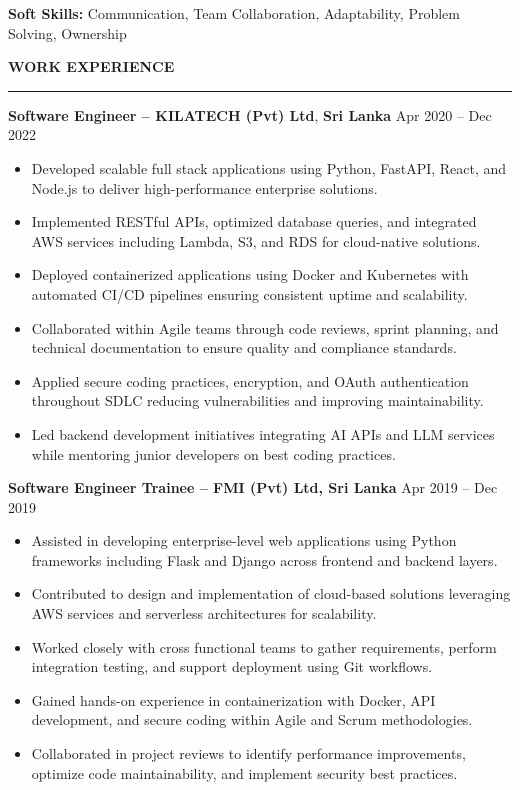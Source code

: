 \documentclass[10pt,letterpaper]{article}
\begin{document}
\textbf{Soft Skills:} Communication, Team Collaboration, Adaptability, Problem Solving, Ownership

\vspace{8pt}

\textbf{WORK EXPERIENCE}\\[-8pt]
\noindent\rule{\textwidth}{1pt}

\vspace{-2pt}

\textbf{Software Engineer -- KILATECH (Pvt) Ltd}, \textbf{Sri Lanka} \hfill Apr 2020 -- Dec 2022

\vspace{-1pt}

\begin{itemize}
\item Developed scalable full stack applications using Python, FastAPI, React, and Node.js to deliver high-performance enterprise solutions.
\item Implemented RESTful APIs, optimized database queries, and integrated AWS services including Lambda, S3, and RDS for cloud-native solutions.
\item Deployed containerized applications using Docker and Kubernetes with automated CI/CD pipelines ensuring consistent uptime and scalability.
\item Collaborated within Agile teams through code reviews, sprint planning, and technical documentation to ensure quality and compliance standards.
\item Applied secure coding practices, encryption, and OAuth authentication throughout SDLC reducing vulnerabilities and improving maintainability.
\item Led backend development initiatives integrating AI APIs and LLM services while mentoring junior developers on best coding practices.
\end{itemize}

\textbf{Software Engineer Trainee -- FMI (Pvt) Ltd, Sri Lanka} \hfill Apr 2019 -- Dec 2019

\vspace{-1pt}

\begin{itemize}
\item Assisted in developing enterprise-level web applications using Python frameworks including Flask and Django across frontend and backend layers.
\item Contributed to design and implementation of cloud-based solutions leveraging AWS services and serverless architectures for scalability.
\item Worked closely with cross functional teams to gather requirements, perform integration testing, and support deployment using Git workflows.
\item Gained hands-on experience in containerization with Docker, API development, and secure coding within Agile and Scrum methodologies.
\item Collaborated in project reviews to identify performance improvements, optimize code maintainability, and implement security best practices.
\end{itemize}
\end{document}

